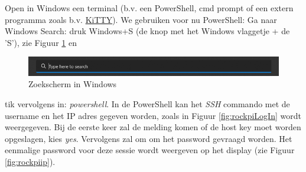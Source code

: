Open in Windows een terminal (b.v. een PowerShell, cmd prompt of een extern programma zoals b.v. \href{https://www.fosshub.com/KiTTY.html}{KiTTY}). We gebruiken voor nu PowerShell: Ga naar Windows Search: druk Windows+S (de knop met het Windows vlaggetje + de 'S'), zie Figuur \ref{fig:windowsZk} en
\begin{figure}[h!]
	\centering
	\begin{center} 	
			\includegraphics[width=1\textwidth]{figuren/windowsPowerShellSearch}
			\caption{Zoekscherm in Windows}
			\label{fig:windowsZk}

	\end{center}
\end{figure}
tik vervolgens in: \textit{powershell}. In de PowerShell kan het \textit{SSH} commando met de username en het IP adres gegeven worden, zoals in Figuur \ref{fig:rockpiLogIn} wordt weergegeven. Bij de eerste keer zal de melding komen of de host key moet worden opgeslagen, kies \textit{yes}. Vervolgens zal om om het password gevraagd worden. Het eenmalige password voor deze sessie wordt weergeven op het display (zie Figuur \ref{fig:rockpiip}). 

